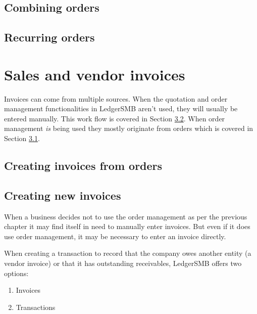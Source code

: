 \section{Combining orders}

\section{Recurring orders}
\label{sec:RecurringOrders}


\chapter{Sales and vendor invoices}

Invoices can come from multiple sources. When the quotation and order
management functionalities in LedgerSMB aren't used, they will usually
be entered manually. This work flow is covered in Section
\ref{sec:ManuallyCreatingInvoices}.
When order management \emph{is} being used they mostly originate from orders
which is covered in Section \ref{sec:InvoicesFromOrders}.



\section{Creating invoices from orders}
\label{sec:InvoicesFromOrders}



\section{Creating new invoices}
\label{sec:ManuallyCreatingInvoices}



When a business decides not to use the order management as per the previous
chapter it may find itself in need to manually enter invoices. But even
if it does use order management, it may be necessary to enter an invoice
directly.

When creating a transaction to record that the company owes another
entity (a vendor invoice) or that it has outstanding receivables,
LedgerSMB offers two options:

\begin{enumerate}
\item Invoices
\item Transactions
\end{enumerate}

